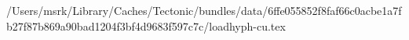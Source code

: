 /Users/msrk/Library/Caches/Tectonic/bundles/data/6ffe055852f8faf66c0acbe1a7fb27f87b869a90bad1204f3bf4d9683f597c7c/loadhyph-cu.tex